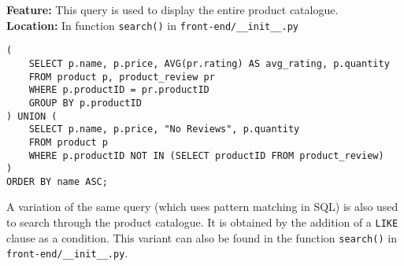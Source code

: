 \textbf{Feature:} This query is used to display the entire product catalogue. \\
\textbf{Location:} In function \texttt{search()} in \texttt{front-end/\_\_init\_\_.py}

\begin{lstlisting}
(
    SELECT p.name, p.price, AVG(pr.rating) AS avg_rating, p.quantity
    FROM product p, product_review pr
    WHERE p.productID = pr.productID
    GROUP BY p.productID
) UNION (
    SELECT p.name, p.price, "No Reviews", p.quantity
    FROM product p
    WHERE p.productID NOT IN (SELECT productID FROM product_review)
)
ORDER BY name ASC;
\end{lstlisting}

A variation of the same query (which uses pattern matching in SQL) is also used to search through the product catalogue.
It is obtained by the addition of a \texttt{LIKE} clause as a condition.
This variant can also be found in the function \texttt{search()} in \texttt{front-end/\_\_init\_\_.py}. \\